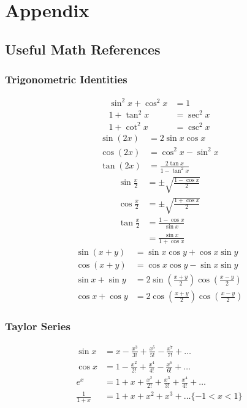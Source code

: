\chapter{Appendix}
\section{Useful Math References}
\subsection{Trigonometric Identities}
\begin{align*}
    \sin^2 x + \cos^2 x &= 1\\
    1 + \tan^2 x &= \sec^2 x\\
    1 + \cot^2 x &= \csc^2 x
\end{align*}
\begin{align*}
    \sin(2x) &= 2 \sin x \cos x\\
    \cos(2x) &= \cos^2 x - \sin^2 x\\
    \tan(2x) &= \frac{2 \tan x}{1 - \tan^2 x}
\end{align*}
\begin{align*}
    \sin \frac{x}{2}  &= \pm \sqrt{ \frac{1 - \cos x }{2} }\\
    \cos \frac{x}{2}  &= \pm \sqrt{ \frac{1 + \cos x }{2} }\\
    \tan \frac{x}{2}  &= \frac{1 - \cos x }{\sin x}\\
                      &= \frac{ \sin x }{ 1 + \cos x }
\end{align*}
\begin{align*}
    \sin(x + y) &= \sin x \cos y + \cos x \sin y\\
    \cos(x + y) &= \cos x \cos y - \sin x \sin y\\
    \sin x + \sin y &= 2 \sin \left( \frac{x + y}{2} \right) \cos \left( \frac{x - y}{2} \right)\\
    \cos x + \cos y &= 2 \cos \left( \frac{x + y}{2} \right) \cos \left( \frac{x - y}{2} \right)
\end{align*}

\subsection{Taylor Series}
\begin{align*}
    \sin x &= x - \frac{x^3}{3!} + \frac{x^5}{5!} - \frac{x^7}{7!} + \dots \\
    \cos x &= 1 - \frac{x^2}{2!} + \frac{x^4}{4!} - \frac{x^6}{6!} + \dots \\
    e^x &= 1 + x + \frac{x^2}{2!} + \frac{x^3}{3!} + \frac{x^4}{4!} + \dots \\
    \frac{1}{1+x} &= 1 + x + x^2 + x^3 + \dots \{-1 < x < 1 \}
\end{align*}


